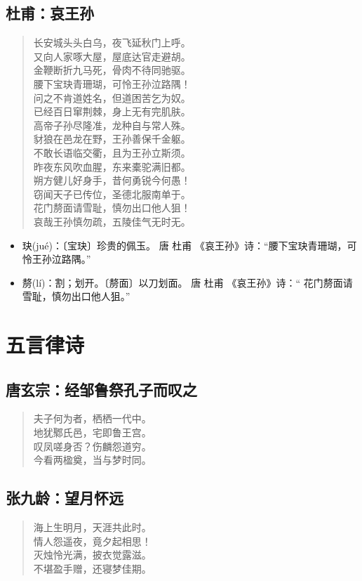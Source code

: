 \documentclass[12pt,oneside]{book}
\newenvironment{shici}{%
\begin{verse}\centering\yanti\large\hspace{12pt}}{\end{verse}}
\begin{document}
\begin{common-format}
\chapter{杜甫：哀王孙}
\begin{shici}
长安城头头白乌，夜飞延秋门上呼。\\
又向人家啄大屋，屋底达官走避胡。\\
金鞭断折九马死，骨肉不待同驰驱。\\
腰下宝玦青珊瑚，可怜王孙泣路隅！\\
问之不肯道姓名，但道困苦乞为奴。\\
已经百日窜荆棘，身上无有完肌肤。\\
高帝子孙尽隆准，龙种自与常人殊。\\
豺狼在邑龙在野，王孙善保千金躯。\\
不敢长语临交衢，且为王孙立斯须。\\
昨夜东风吹血腥，东来橐驼满旧都。\\
朔方健儿好身手，昔何勇锐今何愚！\\
窃闻天子已传位，圣德北服南单于。\\
花门剺面请雪耻，慎勿出口他人狙！\\
哀哉王孙慎勿疏，五陵佳气无时无。
\end{shici}

\begin{itemize}
\item 玦(jué)：〔宝玦〕珍贵的佩玉。  唐 杜甫 《哀王孙》诗：“腰下宝玦青珊瑚，可怜王孙泣路隅。” 
\item 剺(lí)：割；划开。〔剺面〕以刀划面。 唐 杜甫 《哀王孙》诗：“ 花门剺面请雪耻，慎勿出口他人狙。”  
\end{itemize}


\part{五言律诗}
\chapter{唐玄宗：经邹鲁祭孔子而叹之}
\begin{shici}
夫子何为者，栖栖一代中。\\
地犹鄹氏邑，宅即鲁王宫。\\
叹凤嗟身否？伤麟怨道穷。\\
今看两楹奠，当与梦时同。
\end{shici}

\chapter{张九龄：望月怀远}
\begin{shici}
海上生明月，天涯共此时。\\
情人怨遥夜，竟夕起相思！\\
灭烛怜光满，披衣觉露滋。\\
不堪盈手赠，还寝梦佳期。
\end{shici}


\end{common-format}
\end{document}
